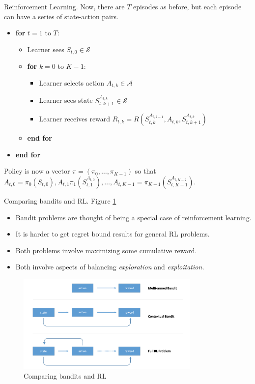 \documentclass[english]{article}
\begin{document}
\item {Reinforcement Learning}. 
Now, there are $T$ episodes as before, but each episode can have a series of state-action pairs. 
\begin{itemize}
    \item[] \textbf{for} $t = 1$ to $T$:
    \begin{itemize}
        \item[] Learner sees $S_{t,0} \in \mathcal{S}$
        \item[] \textbf{for} $k = 0$ to $K-1$:
        \begin{itemize}
        \item[] Learner selects action $A_{t,k} \in \mathcal{A}$ 
        \item[] Learner sees state $S_{t,k+1}^{A_{t,k}} \in \mathcal{S}$
        \item[] Learner receives reward $R_{t,k} = R(S_{t,k}^{A_{t,k-1}}, A_{t, k}, S_{t,k+1}^{A_{t,k}})$
        \end{itemize}
        \item[] \textbf{end for}
    \end{itemize}
    \item[] \textbf{end for}
\end{itemize}
Policy is now a vector $\pi = (\pi_0, \dots, \pi_{K-1})$ so that
$A_{t,0} = \pi_0(S_{t,0}), A_{t,1}\pi_1(S_{t,1}^{A_{t,0}}), \dots, A_{t, K-1} = \pi_{K-1}(S_{t,K-1}^{A_{t,K-2}})$.




\item Comparing bandits and RL. Figure \ref{Comparing bandits and RL} 
\begin{itemize}
    \item Bandit problems are thought of being a special case of reinforcement learning.
    \item It is harder to get regret bound results for general RL problems.
    \item Both problems involve maximizing some cumulative reward.
    \item Both involve aspects of balancing \textit{exploration} and \textit{exploitation.}
\end{itemize}

    \begin{figure}
        \centering
\includegraphics[width=0.8\textwidth]{compare.png}
\caption{Comparing bandits and RL}
\label{Comparing bandits and RL}
    \end{figure}
\end{document}
